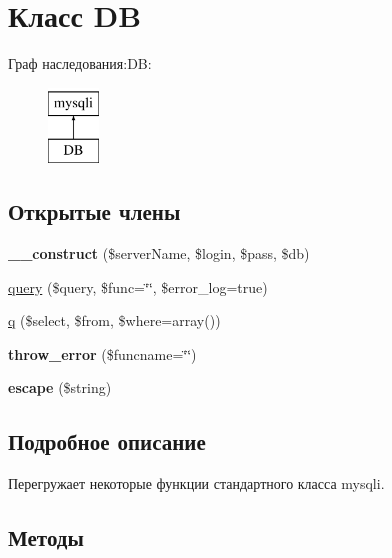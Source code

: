\hypertarget{class_d_b}{}\section{Класс DB}
\label{class_d_b}
Граф наследования\+:DB\+:\begin{figure}[H]
\begin{center}
\leavevmode
\includegraphics[height=2.000000cm]{class_d_b}
\end{center}
\end{figure}
\subsection*{Открытые члены}
\begin{DoxyCompactItemize}
\item 
\mbox{\label{class_d_b_a03b8636c39cbba24d76581635186e5d2}} 
{\bfseries \+\_\+\+\_\+construct} (\$server\+Name, \$login, \$pass, \$db)
\item 
\hyperlink{class_d_b_ad1d77917cf531b111ab5ee86f1ca98c8}{query} (\$query, \$func=\char`\"{}\char`\"{}, \$error\+\_\+log=true)
\item 
\hyperlink{class_d_b_a59b7df33d9b7fcb2d9222c6f3823eab5}{q} (\$select, \$from, \$where=array())
\item 
\mbox{\label{class_d_b_aa07dd114b2a3146de03aabf640688424}} 
{\bfseries throw\+\_\+error} (\$funcname=\char`\"{}\char`\"{})
\item 
\mbox{\label{class_d_b_a812cda4574715397b7ffd0be994adf10}} 
{\bfseries escape} (\$string)
\end{DoxyCompactItemize}


\subsection{Подробное описание}
Перегружает некоторые функции стандартного класса mysqli. 

\subsection{Методы}
\mbox{\label{class_d_b_a59b7df33d9b7fcb2d9222c6f3823eab5}} 
